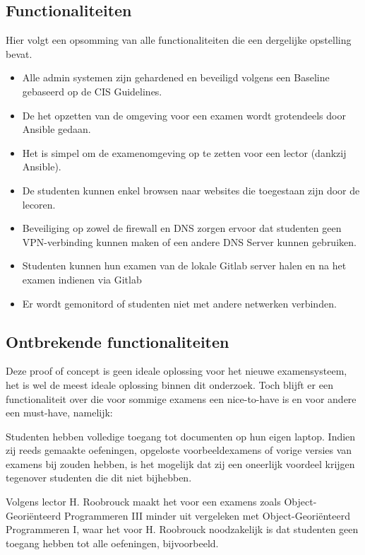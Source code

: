 \subsection{Functionaliteiten}

Hier volgt een opsomming van alle functionaliteiten die een dergelijke opstelling bevat.

\begin{itemize}
	\item Alle admin systemen zijn gehardened en beveiligd volgens een Baseline gebaseerd op de CIS Guidelines.
	\item De het opzetten van de omgeving voor een examen wordt grotendeels door Ansible gedaan.
	\item Het is simpel om de examenomgeving op te zetten voor een lector (dankzij Ansible). 
	\item De studenten kunnen enkel browsen naar websites die toegestaan zijn door de lecoren.
	\item Beveiliging op zowel de firewall en DNS zorgen ervoor dat studenten geen VPN-verbinding kunnen maken of een andere DNS Server kunnen gebruiken.
	\item Studenten kunnen hun examen van de lokale Gitlab server halen en na het examen indienen via Gitlab
	\item Er wordt gemonitord of studenten niet met andere netwerken verbinden.
\end{itemize}

\subsection{Ontbrekende functionaliteiten}

Deze proof of concept is geen ideale oplossing voor het nieuwe examensysteem, het is wel de meest ideale oplossing binnen dit onderzoek.
Toch blijft er een functionaliteit over die voor sommige examens een nice-to-have is en voor andere een must-have, namelijk: 

Studenten hebben volledige toegang tot documenten op hun eigen laptop. Indien zij reeds gemaakte oefeningen, opgeloste voorbeeldexamens of vorige versies van examens bij zouden hebben, is het mogelijk dat zij een oneerlijk voordeel krijgen tegenover studenten die dit niet bijhebben. 

 Volgens lector H. Roobrouck maakt het voor een examens zoals Object-Geori\"{e}nteerd Programmeren III minder uit vergeleken met Object-Geori\"{e}nteerd Programmeren I, waar het voor H. Roobrouck noodzakelijk is dat studenten geen toegang hebben tot alle oefeningen, bijvoorbeeld.

